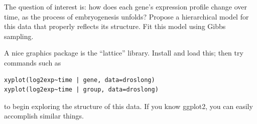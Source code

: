 \documentclass{article}
\begin{document}
The question of interest is: how does each gene's expression profile change over time, as the process of embryogenesis unfolds?  Propose a hierarchical model for this data that properly reflects its structure.  Fit this model using Gibbs sampling.

A nice graphics package is the ``lattice'' library.  Install and load this; then try commands such as
\begin{verbatim}
xyplot(log2exp~time | gene, data=droslong)
xyplot(log2exp~time | group, data=droslong)
\end{verbatim}
to begin exploring the structure of this data.  If you know ggplot2, you can easily accomplish similar things.
\end{document}
